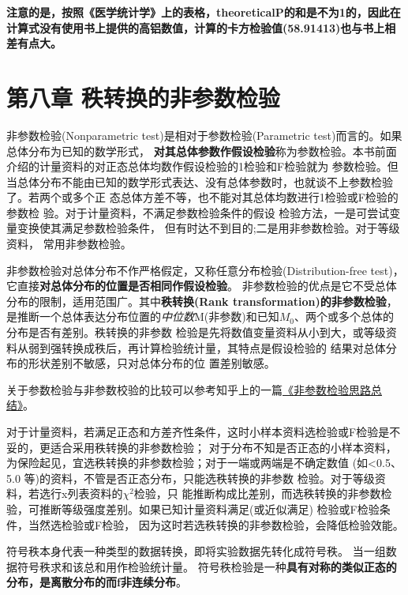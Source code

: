 \documentclass[
]{article}
\begin{document}
\textbf{注意的是，按照《医学统计学》上的表格，theoreticalP的和是不为1的，因此在计算式没有使用书上提供的高铝数值，计算的卡方检验值(58.91413)也与书上相差有点大。}

\hypertarget{ux7b2cux516bux7ae0-ux79e9ux8f6cux6362ux7684ux975eux53c2ux6570ux68c0ux9a8c}{%
\section{第八章 秩转换的非参数检验}\label{ux7b2cux516bux7ae0-ux79e9ux8f6cux6362ux7684ux975eux53c2ux6570ux68c0ux9a8c}}

非参数检验(Nonparametric test)是相对于参数检验(Parametric test)而言的。如果总体分布为已知的数学形式，
\textbf{对其总体参数作假设检验}称为参数检验。本书前面介绍的计量资料的对正态总体均数作假设检验的1检验和F检验就为
参数检验。但当总体分布不能由已知的数学形式表达、没有总体参数时，也就谈不上参数检验了。若两个或多个正
态总体方差不等，也不能对其总体均数进行1检验或F检验的参数检 验。对于计量资料，不满足参数检验条件的假设
检验方法，一是可尝试变量变换使其满足参数检验条件， 但有时达不到目的;二是用非参数检验。对于等级资料，
常用非参数检验。

非参数检验对总体分布不作严格假定，又称任意分布检验(Distribution-free test)，它直接\textbf{对总体分布的位置是否相同作假设检验}。
非参数检验的优点是它不受总体分布的限制，适用范围广。其中\textbf{秩转换(Rank transformation)的非参数检验}，
是推断一个总体表达分布位置的\emph{中位数}M(非参数)和已知\(M_0\)、两个或多个总体的分布是否有差别。秩转换的非参数
检验是先将数值变量资料从小到大，或等级资料从弱到强转换成秩后，再计算检验统计量，其特点是假设检验的
结果对总体分布的形状差别不敏感，只对总体分布的位 置差别敏感。

关于参数检验与非参数校验的比较可以参考知乎上的一篇\href{https://zhuanlan.zhihu.com/p/93196547}{《非参数检验思路总结》}。

对于计量资料，若满足正态和方差齐性条件，这时小样本资料选检验或F检验是不妥的，更适合采用秩转换的非参数检验；
对于分布不知是否正态的小样本资料，为保险起见，宜选秩转换的非参数检验；对于一端或两端是不确定数值
(如\textless0.5、5.0 等)的资料，不管是否正态分布，只能选秩转换的非参数 检验。对于等级资料，若选行x列表资料的\(\chi^2\)检验，只
能推断构成比差别，而选秩转换的非参数检验，可推断等级强度差别。如果已知计量资料满足(或近似满足) 检验或F检验条件，当然选检验或F检验， 因为这时若选秩转换的非参数检验，会降低检验效能。

符号秩本身代表一种类型的数据转换，即将实验数据先转化成符号秩。 当一组数据符号秩求和该总和用作检验统计量。 符号秩检验是一种\textbf{具有对称的类似正态的分布，是离散分布的而f非连续分布}。
\end{document}
